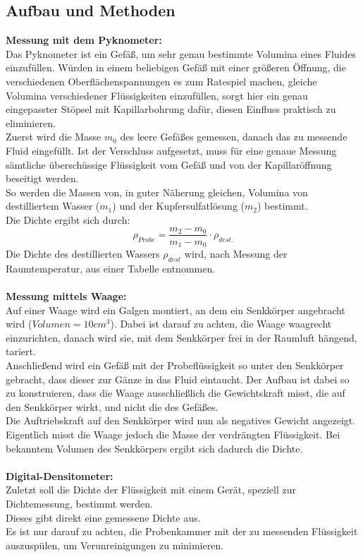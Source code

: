 \documentclass[12pt,a4paper]{article}
\begin{document}
\begin{multicols}{2}



\subsection{Aufbau und Methoden}
\textbf{Messung mit dem Pyknometer:}\\
Das Pyknometer ist ein Gefäß, um sehr genau bestimmte Volumina eines Fluides einzufüllen. Würden in einem beliebigen Gefäß mit einer größeren Öffnung, die verschiedenen Oberflächenspannungen es zum Ratespiel machen, gleiche Volumina verschiedener Flüssigkeiten einzufüllen, sorgt hier ein genau eingepasster Stöpsel mit Kapillarbohrung dafür, diesen Einfluss praktisch zu eliminieren.\\
Zuerst wird die Masse $m_0$ des leere Gefäßes gemessen, danach das zu messende Fluid eingefüllt. Ist der Verschluss aufgesetzt, muss für eine genaue Messung sämtliche überschüssige Flüssigkeit vom Gefäß und von der Kapillaröffnung beseitigt werden.\\
So werden die Massen von, in guter Näherung gleichen, Volumina von destilliertem Wasser ($m_1$) und der Kupfersulfatlösung ($m_2$) bestimmt.\\
Die Dichte ergibt sich durch:
$$\rho_{Probe}=\frac{m_2-m_0}{m_1-m_0}\cdot \rho_{dest.}$$
Die Dichte des destillierten Wassers $\rho_{dest}$ wird, nach Messung der Raumtemperatur, aus einer Tabelle entnommen.\\
\\
\textbf{Messung mittels Waage:}\\
Auf einer Waage wird ein Galgen montiert, an dem ein Senkkörper angebracht wird ($Volumen=10cm^3$). Dabei ist darauf zu achten, die Waage waagrecht einzurichten, danach wird sie, mit dem Senkkörper frei in der Raumluft hängend, tariert.\\
Anschließend wird ein Gefäß mit der Probeflüssigkeit so unter den Senkkörper gebracht, dass dieser zur Gänze in das Fluid eintaucht. Der Aufbau ist dabei so zu konstruieren, dass die Waage ausschließlich die Gewichtskraft misst, die auf den Senkkörper wirkt, und nicht die des Gefäßes.\\
Die Auftriebskraft auf den Senkkörper wird nun als negatives Gewicht angezeigt. Eigentlich misst die Waage jedoch die Masse der verdrängten Flüssigkeit. Bei bekanntem Volumen des Senkkörpers ergibt sich dadurch die Dichte.\\
\\
\textbf{Digital-Densitometer:}\\
Zuletzt soll die Dichte der Flüssigkeit mit einem Gerät, speziell zur Dichtemessung, bestimmt werden.\\
Dieses gibt direkt eine gemessene Dichte aus.\\
Es ist nur darauf zu achten, die Probenkammer mit der zu messenden Flüssigkeit auszuspülen, um Verunreinigungen zu minimieren.


\end{multicols}
\end{document}
